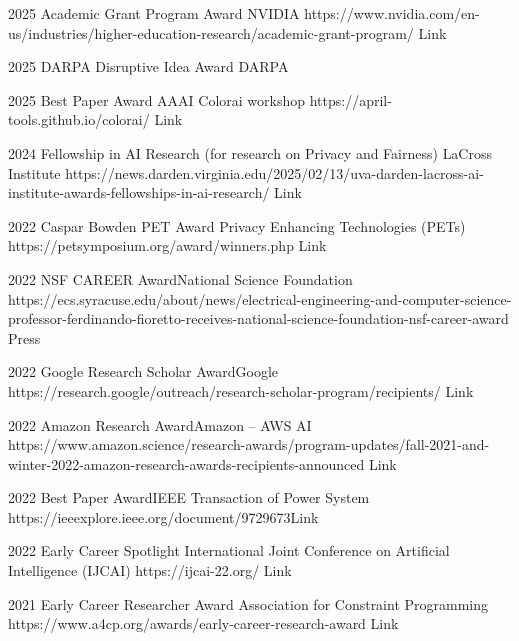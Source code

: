 \documentclass[localFont,alternative]{documentMETADATA}
\begin{document}
\vspace{-6pt}
\vspace{-6pt}

\begin{awards}
	\awardentry
	{2025}
	{Academic Grant Program Award}
	{NVIDIA}%
	{https://www.nvidia.com/en-us/industries/higher-education-research/academic-grant-program/}
	{Link}

	\awardentry
	{2025}
	{DARPA Disruptive Idea Award}
	{DARPA}
	{}{}

	\awardentry
	{2025}
	{Best Paper Award}
	{AAAI Colorai workshop}
	{https://april-tools.github.io/colorai/}
	{Link}

	\awardentry
	{2024}
	{Fellowship in AI Research (for research on Privacy and Fairness)}
	{LaCross Institute}
	{https://news.darden.virginia.edu/2025/02/13/uva-darden-lacross-ai-institute-awards-fellowships-in-ai-research/}
	{Link}

	\awardentry
	{2022}
	{Caspar Bowden PET Award}%
	{Privacy Enhancing Technologies (PETs)}
	{https://petsymposium.org/award/winners.php}
	{Link}

	\awardentry
	{2022}
	{NSF CAREER Award}{National Science Foundation}
	{https://ecs.syracuse.edu/about/news/electrical-engineering-and-computer-science-professor-ferdinando-fioretto-receives-national-science-foundation-nsf-career-award}
	{Press}

	\awardentry
	{2022}
	{Google Research Scholar Award}{Google}
	{https://research.google/outreach/research-scholar-program/recipients/}
	{Link}

	\awardentry
	{2022}
	{Amazon Research Award}{Amazon -- AWS AI}
	{https://www.amazon.science/research-awards/program-updates/fall-2021-and-winter-2022-amazon-research-awards-recipients-announced}
	{Link}

	\awardentry
	{2022}
	{Best Paper Award}{IEEE Transaction of Power System}
	{https://ieeexplore.ieee.org/document/9729673}{Link}

	\awardentry
	{2022}
	{Early Career Spotlight}%
	{International Joint Conference on Artificial Intelligence (IJCAI)}
	{https://ijcai-22.org/}
	{Link}

	\awardentry
	{2021}
	{Early Career Researcher Award}
	{Association for Constraint Programming}
	{https://www.a4cp.org/awards/early-career-research-award}
	{Link}


\end{awards}
\end{document}

